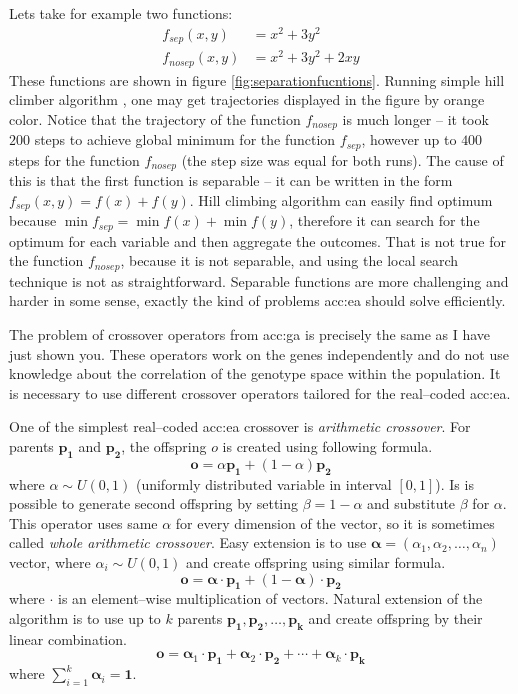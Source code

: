 Lets take for example two functions:
\begin{align*}
    f_{sep}(x,y)&=x^2+3y^2 \\
    f_{nosep}(x,y)&=x^2+3y^2+2xy
\end{align*}
These functions are shown in figure \ref{fig:separationfucntions}. Running simple hill climber algorithm \citep{HandbookOfMetaheuristics}, one may get trajectories displayed in the figure by orange color. Notice that the trajectory of the function $f_{nosep}$ is much longer -- it took $200$ steps to achieve global minimum for the function $f_{sep}$, however up to $400$ steps for the function $f_{nosep}$ (the step size was equal for both runs). The cause of this is that the first function is separable -- it can be written in the form $f_{sep}(x,y)=f(x)+f(y)$. Hill climbing algorithm can easily find optimum because $\min f_{sep}=\min f(x)+\min f(y)$, therefore it can search for the optimum for each variable and then aggregate the outcomes. That is not true for the function $f_{nosep}$, because it is not separable, and using the local search technique is not as straightforward. Separable functions are more challenging and harder in some sense, exactly the kind of problems \acrshort{acc:ea} should solve efficiently.

The problem of crossover operators from \acrshort{acc:ga} is precisely the same as I have just shown you. These operators work on the genes independently and do not use knowledge about the correlation of the genotype space within the population. It is necessary to use different crossover operators tailored for the real--coded \acrshort{acc:ea}.

One of the simplest real--coded \acrshort{acc:ea} crossover is \emph{arithmetic crossover}. For parents $\mathbf{p_1}$ and $\mathbf{p_2}$, the offspring $o$ is created using following formula.
$$
\mathbf{o} = \alpha\mathbf{p_1}+\left(1-\alpha\right)\mathbf{p_2}
$$
where $\alpha \sim U(0,1)$ (uniformly distributed variable in interval $\left[0,1\right]$). Is is possible to generate second offspring by setting $\beta=1-\alpha$ and substitute $\beta$ for $\alpha$. This operator uses same $\alpha$ for every dimension of the vector, so it is sometimes called \emph{whole arithmetic crossover}. Easy extension is to use $\boldsymbol{\alpha}=(\alpha_1,\alpha_2,\dots,\alpha_n)$ vector, where $\alpha_i\sim U(0,1)$ and create offspring using similar formula.
$$
\mathbf{o} = \boldsymbol{\alpha}\cdot\mathbf{p_1}+\left(1-\boldsymbol{\alpha}\right)\cdot\mathbf{p_2}
$$
where $\cdot$ is an element--wise multiplication of vectors.
Natural extension of the algorithm is to use up to $k$ parents $\mathbf{p_1}, \mathbf{p_2},\dots,\mathbf{p_k}$ and create offspring by their linear combination.
$$
\mathbf{o} = 
\boldsymbol{\alpha}_1\cdot\mathbf{p_1}+
\boldsymbol{\alpha}_2\cdot\mathbf{p_2}+
\cdots +
\boldsymbol{\alpha}_k\cdot\mathbf{p_k}
$$
where $\sum_{i=1}^{k}\boldsymbol{\alpha}_i=\boldsymbol{1}$.

